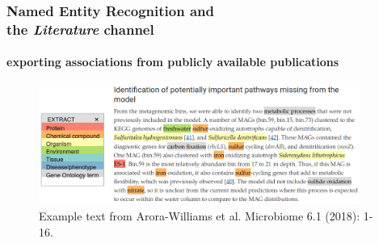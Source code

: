 \documentclass{beamer}
\begin{document}
   \begin{frame}
      \frametitle{Named Entity Recognition and \\ the \textit{Literature} channel}
      \framesubtitle{exporting associations from publicly available publications}
      \begin{figure}
         \includegraphics[width=105mm]{resources/extract_example_transp.png}
         \caption{
            \scriptsize Example text from Arora-Williams et al. Microbiome 6.1 (2018): 1-16.
         }
      \end{figure}
   \end{frame}
\end{document}
